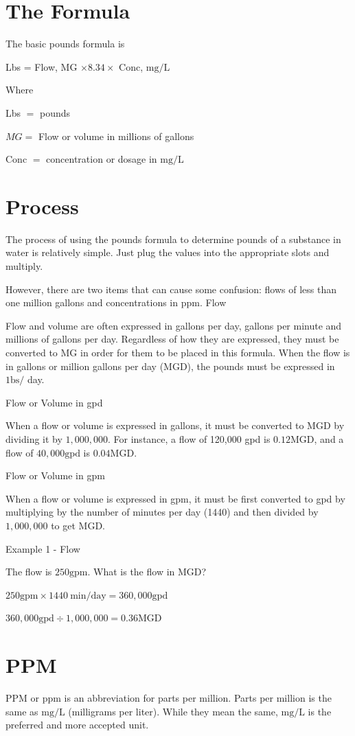 \documentclass[10pt]{article}
\begin{document}
\section{The Formula}
The basic pounds formula is

Lbs = Flow, MG $\times 8.34 \times$ Conc, $\mathrm{mg} / \mathrm{L}$

Where

Lbs $=$ pounds

$M G=$ Flow or volume in millions of gallons

Conc $=$ concentration or dosage in $\mathrm{mg} / \mathrm{L}$

\section{Process}
The process of using the pounds formula to determine pounds of a substance in water is relatively simple. Just plug the values into the appropriate slots and multiply.

However, there are two items that can cause some confusion: flows of less than one million gallons and concentrations in ppm. Flow

Flow and volume are often expressed in gallons per day, gallons per minute and millions of gallons per day. Regardless of how they are expressed, they must be converted to MG in order for them to be placed in this formula. When the flow is in gallons or million gallons per day (MGD), the pounds must be expressed in $1 \mathrm{bs} /$ day.

Flow or Volume in gpd

When a flow or volume is expressed in gallons, it must be converted to MGD by dividing it by $1,000,000$. For instance, a flow of 120,000 gpd is $0.12 \mathrm{MGD}$, and a flow of $40,000 \mathrm{gpd}$ is $0.04 \mathrm{MGD}$.

Flow or Volume in gpm

When a flow or volume is expressed in gpm, it must be first converted to gpd by multiplying by the number of minutes per day (1440) and then divided by $1,000,000$ to get MGD.

Example 1 - Flow

The flow is $250 \mathrm{gpm}$. What is the flow in MGD?

$250 \mathrm{gpm} \times 1440 \mathrm{~min} / \mathrm{day}=360,000 \mathrm{gpd}$

$360,000 \mathrm{gpd} \div 1,000,000=0.36 \mathrm{MGD}$

\section{PPM}
PPM or ppm is an abbreviation for parts per million. Parts per million is the same as $\mathrm{mg} / \mathrm{L}$ (milligrams per liter). While they mean the same, $\mathrm{mg} / \mathrm{L}$ is the preferred and more accepted unit.
\end{document}

